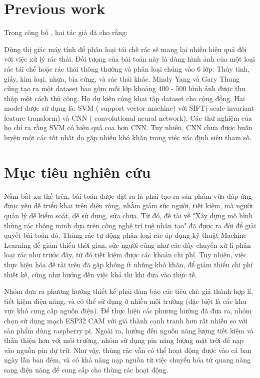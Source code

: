 \section{Previous work}
Trong công bố  \cite{trashnet}, hai tác giả đã cho rằng:

Dùng thị giác máy tính để phân loại tái chế rác sẽ mang lại nhiều hiệu quả đối với việc xử lý rác thải. Đối tưọng của bài toán này là dùng hình ảnh của một loại rác tái chế hoặc rác thải thông thường và phân loại chúng vào 6 lớp: Thủy tinh, giấy, kim loại, nhựa, bìa cứng, và rác thải khác. Mindy Yang và Gary Thung cũng tạo ra một dataset bao gồm mỗi lớp khoảng 400 - 500 hình ảnh được thu thập một cách thủ công. Họ dự kiến công khai tập dataset cho cộng đồng. Hai model được sử dụng là: SVM ( support vector machine) với SIFT( scale-invariant feature transform) và CNN ( convolutional neural network). Các thử nghiệm của họ chỉ ra rằng SVM có hiệu quả coa hơn CNN. Tuy nhiên, CNN chưa được huấn luyện một các tốt nhất do gặp nhiều khó khăn trong việc xác định siêu tham số.

\section{Mục tiêu nghiên cứu}
Nắm bắt xu thế trên, bài toán được đặt ra là phải tạo ra sản phẩm vừa đáp ứng được yêu dễ triển khai trên diện rộng, nhằm giảm sức người, tiết kiệm, mà người quản lý dễ kiểm soát, dễ sử dụng, sửa chữa.
Từ đó, đề tài về "Xây dựng mô hình thùng rác thông minh dựa trên công nghệ trí tuệ nhân tạo" đã được ra đời để giải quyết bài toán đó. 
Thùng rác tự động phân loại rác áp dụng kỹ thuật Machine Learning để giảm thiểu thời gian, sức người cũng như các dây chuyển xử lí phân loại rác như trước đây, từ đó tiết kiệm được các khoản chi phí.
Tuy nhiên, việc thực hiện hóa đề tài trên đã gặp không ít nhũng khó khăn, để giảm thiểu chi phí thiết kế, cũng như hướng đến việc khả thi khi đưa vào thực tế.

Nhóm đưa ra phương hướng thiết kế phải đảm bảo các tiêu chí: giá thành hợp lí, tiết kiệm điện năng, và có thể sử dụng ở nhiều môi trường (đặc biệt là các khu vực khó cung cấp nguồn điện).
Để thực hiện các phương hướng đã đưa ra, nhóm chọn sử dụng mạch ESP32 CAM với giá thành cạnh tranh hơn rất nhiều so với sản phẩm dùng raspberry pi.
Ngoài ra, hướng đến nguồn năng lượng tiết kiệm và thân thiện hơn với môi trường, nhóm sử dụng pin năng lượng mặt trời để nạp vào nguồn pin dự trữ.
Như vậy, thùng rác vẫn có thể hoạt động được vào cả ban ngày lẫn ban đêm, và có khả năng nạp nguồn từ việc chuyển hóa từ quang năng sang điện năng để cung cấp cho thùng rác hoạt động.


